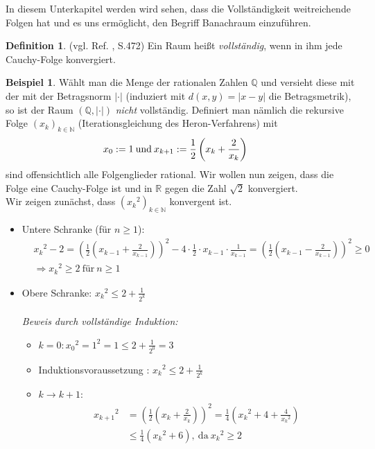 \documentclass[10pt,a4paper]{article}
\theoremstyle{plain}
\theoremstyle{definition}
\newtheorem{definition}[satz]{Definition}
\newenvironment{dfi}{\begin{shaded}\begin{definition}}{\end{definition}\end{shaded}}
\theoremstyle{nonumberplain}
\newtheorem{beispiel}{Beispiel}
\newenvironment{bsp}{\begin{beispiel}}{\end{beispiel}}
\newcommand{\N}{\mathbb{N}}
\newcommand{\Q}{\mathbb{Q}}
\newcommand{\R}{\mathbb{R}}
\begin{document}
In diesem Unterkapitel werden wird sehen, dass die Vollständigkeit weitreichende Folgen hat und es uns ermöglicht, den Begriff Banachraum einzuführen.
\begin{dfi}
(vgl. Ref. \cite{Werner}, S.472) Ein Raum heißt \textit{vollständig}, wenn in ihm jede Cauchy-Folge konvergiert.
\end{dfi}
\begin{bsp}
Wählt man die Menge der rationalen Zahlen $\Q$ und versieht diese mit der mit der Betragsnorm $|\cdot|$ (induziert mit $d(x,y) = |x - y|$ die Betragsmetrik), so ist der Raum $(\Q, |\cdot|)$ \textit{nicht} vollständig. Definiert man nämlich die rekursive Folge ${(x_k)_{k \in \N}}$ (Iterationsgleichung des Heron-Verfahrens) mit
\begin{align*}
& x_0 := 1 \: \text{und} \: x_{k+1} := {1 \over 2}\left(x_k + {2 \over x_k}\right)
\end{align*}
sind offensichtlich alle Folgenglieder rational. Wir wollen nun zeigen, dass die Folge eine Cauchy-Folge ist und in $\R$ gegen die Zahl $\sqrt{2}$ konvergiert.
\\Wir zeigen zunächst, dass ${({x_k}^2)}_{k \in \N}$ konvergent ist.
\begin{itemize}
\item Untere Schranke (für $n\geq 1$):
\begin{align*}
&{x_k}^2 -2 = \left(\frac{1}{2}\left(x_{k -1} + \frac{2}{x_{k-1}}\right)\right)^2 - 4\cdot \frac{1}{2} \cdot x_{k-1} \cdot \frac{1}{x_{k-1} } = \left(\frac{1}{2}\left(x_{k-1} - \frac{2}{x_{k-1}}\right)\right)^2 \geq 0 \\
&\Rightarrow {x_k}^2 \geq 2 \: \text{für} \: n \geq 1
\end{align*}
\item Obere Schranke: ${x_k}^2 \leq 2 + \frac{1}{2^k} $\\\\
\textit{Beweis durch vollständige Induktion:}
\begin{itemize}
\item $k = 0: {x_0}^2 = 1^2 = 1 \leq 2 + \frac{1}{2^0} = 3$
\item Induktionsvoraussetzung : ${x_k}^2 \leq 2 + \frac{1}{2^k}$
\item $k \rightarrow k + 1$: 
\begin{align*}
{x_{k+1}}^2 &= {\left(\frac{1}{2}(x_k + \frac{2}{x_k})\right)}^2 = \frac{1}{4} \left({x_k}^2 + 4 + \frac{4}{{x_k}^2}\right)\\
&\leq \frac{1}{4} ({x_k}^2 + 6), \: \text{da} \: {x_k}^2 \geq 2\\

\end{align*}
\end{itemize}
\end{itemize}
\end{bsp}
\end{document}
